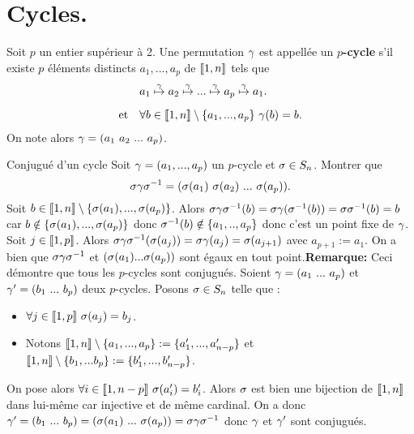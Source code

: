\documentclass[11pt]{article}
\begin{document}
\section{Cycles.}

\begin{defi}{}{}
    Soit $p$ un entier supérieur à 2.\n
    Une permutation $\gamma$ est appellée un $p$\textbf{-cycle} s'il existe $p$ éléments distincts $a_1,...,a_p$ de $\llbracket1,n\rrbracket$ tels que
    \begin{align*}
        &a_1\overset{\g}{\mapsto}a_2\overset{\g}{\mapsto}...\overset{\g}{\mapsto}a_p\overset{\g}{\mapsto}a_1.\n
        \text{et} \quad &\forall b \in \lb1,n\rb\setminus\{a_1,...,a_p\} ~ \g(b)=b.
    \end{align*}
    On note alors $\gamma=(a_1~a_2~...~a_p)$.
\end{defi}


\begin{ex}{Conjugué d'un cycle}{}
    Soit $\gamma=(a_1,...,a_p)$ un $p$-cycle et $\sigma\in S_n$. Montrer que
    \begin{equation*}
        \sigma\gamma\sigma^{-1}=(\sigma(a_1)~\sigma(a_2)~...~\sigma(a_p)).
    \end{equation*}
    \tcblower
    Soit $b\in\llbracket1,n\rrbracket\setminus\{\sigma(a_1),...,\sigma(a_p)\}$.\n
    Alors $\sigma\gamma\sigma^{-1}(b)=\sigma\gamma(\sigma^{-1}(b))=\sigma\sigma^{-1}(b)=b$ car $b\notin\{\sigma(a_1),...,\sigma(a_p)\}$ donc $\sigma^{-1}(b)\notin\{a_1,..,a_p\}$ donc c'est un point fixe de $\gamma$.\n
    Soit $j\in\llbracket1,p\rrbracket$.\n
    Alors $\sigma\gamma\sigma^{-1}(\sigma(a_j))=\sigma\gamma(a_j)=\sigma(a_{j+1})$ avec $a_{p+1}:=a_1$.\n
    On a bien que $\sigma\gamma\sigma^{-1}$ et $(\sigma(a_1)...\sigma(a_p))$ sont égaux en tout point.\n[0.2cm]
    \textbf{Remarque:} Ceci démontre que tous les $p$-cycles sont conjugués.\n
    Soient $\gamma=(a_1~...~a_p)$ et $\gamma'=(b_1~...~b_p)$ deux $p$-cycles.\n
    Posons $\sigma\in S_n$ telle que :
    \begin{itemize}
        \item $\forall j \in \llbracket 1, p \rrbracket ~ \sigma(a_j) = b_j$.
        \item Notons $\llbracket 1, n \rrbracket \setminus \{a_1, ..., a_p\} := \{a_1', ..., a_{n-p}'\}$ et $\llbracket 1, n \rrbracket \setminus \{b_1, ... b_p\} := \{b_1', ... , b_{n-p}'\}$.
    \end{itemize}
    On pose alors $\forall i\in\llbracket1,n-p\rrbracket ~ \sigma(a_i')=b_i'$.\n
    Alors $\sigma$ est bien une bijection de $\llbracket1,n\rrbracket$ dans lui-même car injective et de même cardinal.\n
    On a donc $\gamma'=(b_1~...~b_p) = (\sigma(a_1)~...~\sigma(a_p))=\sigma\gamma\sigma^{-1}$ donc $\gamma$ et $\gamma'$ sont conjugués.
\end{ex}
\end{document}
